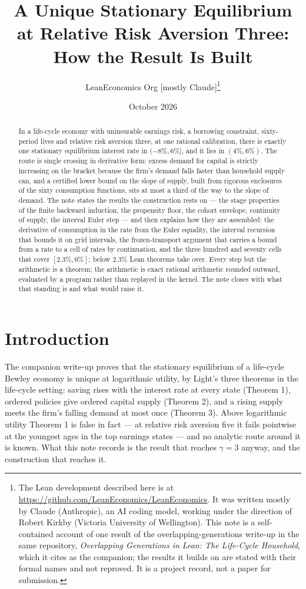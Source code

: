 \documentclass[11pt]{article}
\title{A Unique Stationary Equilibrium at Relative Risk Aversion Three:\\
How the Result Is Built}
\author{LeanEconomics Org [mostly Claude]\thanks{The Lean development described here is at
\url{https://github.com/LeanEconomics/LeanEconomics}. It was written mostly by Claude (Anthropic),
an AI coding model, working under the direction of Robert Kirkby (Victoria University of
Wellington). This note is a self-contained account of one result of the overlapping-generations
write-up in the same repository, \emph{Overlapping Generations in Lean: The Life-Cycle Household},
which it cites as the companion; the results it builds on are stated with their formal names and
not reproved. It is a project record, not a paper for submission.}}
\date{October 2026}
\theoremstyle{definition}
\theoremstyle{remark}
\begin{document}
\maketitle

\begin{abstract}
\noindent
In a life-cycle economy with uninsurable earnings risk, a borrowing constraint, sixty-period lives
and relative risk aversion three, at one rational calibration, there is exactly one stationary
equilibrium interest rate in $(-8\%,6\%]$, and it lies in $(4\%,6\%)$. The route is single crossing in
derivative form: excess
demand for capital is strictly increasing on the bracket because the firm's demand falls faster
than household supply can, and a certified lower bound on the slope of supply, built from rigorous
enclosures of the sixty consumption functions, sits at most a third of the way to the slope of
demand. The note states the results the construction rests on --- the stage properties of the
finite backward induction, the propensity floor, the cohort envelope, continuity of supply, the
interval Euler step --- and then explains how they are assembled: the derivative of consumption in
the rate from the Euler equality, the interval recursion that bounds it on grid intervals, the
frozen-transport argument that carries a bound from a rate to a cell of rates by continuation, and
the three hundred and seventy cells that cover $[2.3\%,6\%]$; below $2.3\%$ Lean theorems take
over. Every step but the arithmetic is a theorem; the
arithmetic is exact rational arithmetic rounded outward, evaluated by a program rather than
replayed in the kernel. The note closes with what that standing is and what would raise it.
\end{abstract}

\section{Introduction}

The companion write-up proves that the stationary equilibrium of a life-cycle Bewley economy is
unique at logarithmic utility, by Light's three theorems in the life-cycle setting: saving rises
with the interest rate at every state (Theorem 1), ordered policies give ordered capital supply
(Theorem 2), and a rising supply meets the firm's falling demand at most once (Theorem 3). Above
logarithmic utility Theorem 1 is false in fact --- at relative risk aversion five it fails pointwise
at the youngest ages in the top earnings states --- and no analytic route around it is known. What
this note records is the result that reaches $\gamma=3$ anyway, and the construction that reaches it.
\end{document}
